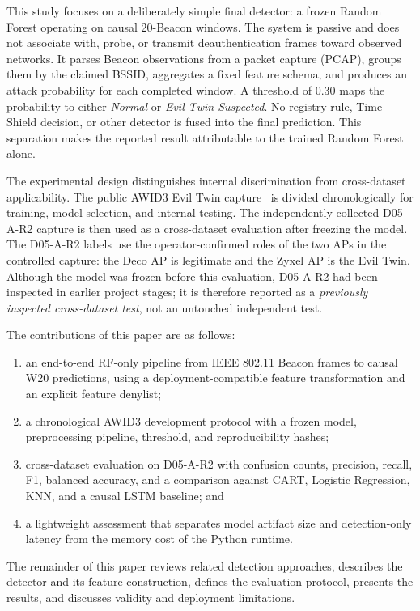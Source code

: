 \documentclass[conference]{IEEEtran}
\begin{document}
This study focuses on a deliberately simple final detector: a frozen Random Forest operating on causal 20-Beacon windows. The system is passive and does not associate with, probe, or transmit deauthentication frames toward observed networks. It parses Beacon observations from a packet capture (PCAP), groups them by the claimed BSSID, aggregates a fixed feature schema, and produces an attack probability for each completed window. A threshold of 0.30 maps the probability to either \emph{Normal} or \emph{Evil Twin Suspected}. No registry rule, Time-Shield decision, or other detector is fused into the final prediction. This separation makes the reported result attributable to the trained Random Forest alone.

The experimental design distinguishes internal discrimination from cross-dataset applicability. The public AWID3 Evil Twin capture~\cite{chatzoglou2021awid3} is divided chronologically for training, model selection, and internal testing. The independently collected D05-A-R2 capture is then used as a cross-dataset evaluation after freezing the model. The D05-A-R2 labels use the operator-confirmed roles of the two APs in the controlled capture: the Deco AP is legitimate and the Zyxel AP is the Evil Twin. Although the model was frozen before this evaluation, D05-A-R2 had been inspected in earlier project stages; it is therefore reported as a \emph{previously inspected cross-dataset test}, not an untouched independent test.

The contributions of this paper are as follows:
\begin{enumerate}
    \item an end-to-end RF-only pipeline from IEEE 802.11 Beacon frames to causal W20 predictions, using a deployment-compatible feature transformation and an explicit feature denylist;
    \item a chronological AWID3 development protocol with a frozen model, preprocessing pipeline, threshold, and reproducibility hashes;
    \item cross-dataset evaluation on D05-A-R2 with confusion counts, precision, recall, F1, balanced accuracy, and a comparison against CART, Logistic Regression, KNN, and a causal LSTM baseline; and
    \item a lightweight assessment that separates model artifact size and detection-only latency from the memory cost of the Python runtime.
\end{enumerate}

The remainder of this paper reviews related detection approaches, describes the detector and its feature construction, defines the evaluation protocol, presents the results, and discusses validity and deployment limitations.
\end{document}
